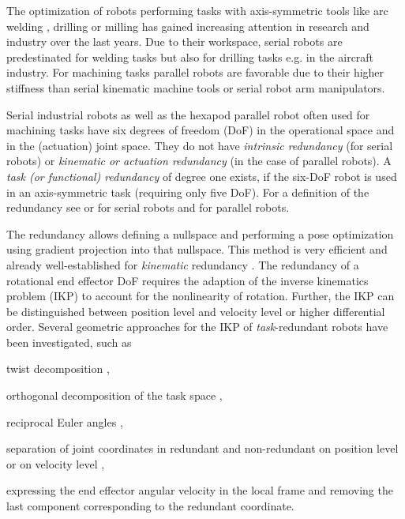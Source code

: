 \documentclass[a4paper,twoside]{article}
\begin{document}
The optimization of robots performing tasks with axis-symmetric tools like arc welding \cite{HuoBar2008}, drilling \cite{GuoDonKe2015} or milling \cite{MousaviGagBouRay2018} has gained increasing attention in research and industry over the last years.
Due to their workspace, serial robots are predestinated for welding tasks but also for drilling tasks e.g. in the aircraft industry.
For machining tasks parallel robots are favorable due to their higher stiffness than serial kinematic machine tools or serial robot arm manipulators.

Serial industrial robots as well as the hexapod parallel robot often used for machining tasks have six degrees of freedom (DoF) in the operational space and in the (actuation) joint space.
They do not have \emph{intrinsic redundancy} (for serial robots) or \emph{kinematic or actuation redundancy} (in the case of parallel robots).
A \emph{task (or functional) redundancy} of degree one exists, if the six-DoF robot is used in an axis-symmetric task (requiring only five DoF).
For a definition of the redundancy see \cite{HuoBar2008} or \cite{LegerAng2016} for serial robots and \cite{GosselinSch2018} for parallel robots.

The redundancy allows defining a nullspace and performing a pose optimization using gradient projection into that nullspace.
This method is very efficient and already well-established for \emph{kinematic} redundancy \cite{NakamuraHanYos1987,ChiaveriniOriWal2008,LilloChiAnt2019}.
The redundancy of a rotational end effector DoF requires the adaption of the inverse kinematics problem (IKP) to account for the nonlinearity of rotation.
Further, the IKP can be distinguished between position level and velocity level or higher differential order.
Several geometric approaches for the IKP of \emph{task}-redundant robots have been investigated, such as 
\begin{compactitem}
\item twist decomposition \cite{HuoBar2008},
\item orthogonal decomposition of the task space \cite{LegerAng2016,CorinaldiAngCal2016},
\item reciprocal Euler angles
 \cite{SchapplerTapOrt2019},
\item separation of joint coordinates in redundant and non-redundant on position level \cite{Ozgoren2013} or on velocity level \cite{ReiterMueGat2018},
\item expressing the end effector angular velocity in the local frame and removing the last component \cite{Zlajpah2017,ReiterMueGat2018} corresponding to the redundant coordinate.
\end{compactitem}
\pagebreak
\end{document}

